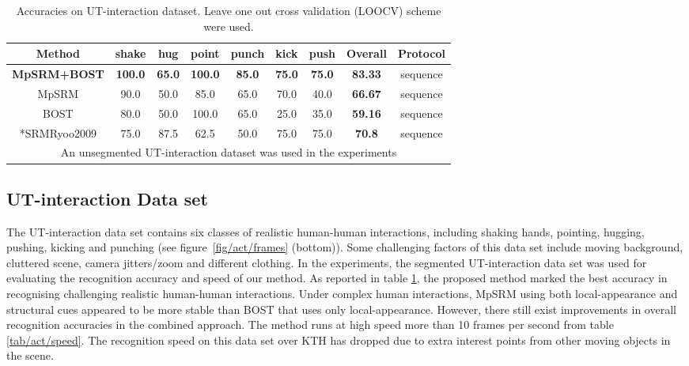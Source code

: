 \begin{table}
\centering
{\footnotesize
\begin{tabular}{|c|c|c|c|c|c|c|c|c|}
\hline
Method & shake & hug & point & punch & kick & push & \textbf{ Overall} & Protocol \\
\hline
\textbf{ \color{blue} MpSRM+BOST} & \textbf{ \color{blue} 100.0} & \textbf{ \color{blue}65.0} & \textbf{ \color{blue}100.0} & \textbf{ \color{blue}85.0} & \textbf{ \color{blue}75.0} & \textbf{ \color{blue}75.0} & \textbf{ \color{blue}83.33} & sequence\\
MpSRM & 90.0 & 50.0 & 85.0 & 65.0 & 70.0 & 40.0 & \textbf{ 66.67} & sequence\\
BOST & 80.0 & 50.0 & 100.0 & 65.0 & 25.0 & 35.0 & \textbf{ 59.16} & sequence\\
\hline
*SRM{Ryoo2009} & 75.0 & 87.5 & 62.5 & 50.0 & 75.0 & 75.0 & \textbf{ 70.8} & sequence\\
\hline
\multicolumn{9}{p{0.9\linewidth}}{\scriptsize * An unsegmented UT-interaction dataset was used in the experiments}\\
\end{tabular}
}
\caption{Accuracies on UT-interaction dataset. Leave one out cross validation (LOOCV) scheme were used.}
\label{tab/act/utcompare}
\end{table}
\subsection{UT-interaction Data set}
The UT-interaction data set contains six classes of realistic human-human interactions, including shaking hands, pointing, hugging, pushing, kicking and punching (see figure~\ref{fig/act/frames} (bottom)). Some challenging factors of this data set include moving background, cluttered scene, camera jitters/zoom and different clothing. In the experiments, the segmented UT-interaction data set was used for evaluating the recognition accuracy and speed of our method. As reported in table \ref{tab/act/utcompare}, the proposed method marked the best accuracy in recognising challenging realistic human-human interactions. Under complex human interactions, MpSRM using both local-appearance and structural cues appeared to be more stable than BOST that uses only local-appearance. However, there still exist improvements in overall recognition accuracies in the combined approach. The method runs at high speed more than 10 frames per second from table \ref{tab/act/speed}. The recognition speed on this data set over KTH has dropped due to extra interest points from other moving objects in the scene.

